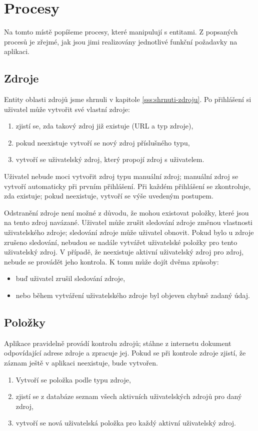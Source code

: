 \section{Procesy}

Na tomto místě popíšeme procesy, které manipulují s entitami.
Z popsaných procesů je zřejmé, jak jsou jimi realizovány jednotlivé funkční požadavky na aplikaci.

\subsection{Zdroje}

Entity oblasti zdrojů jsme shrnuli v kapitole \ref{sss:shrnuti-zdroju}.
Po přihlášení si uživatel může vytvořit své vlastní zdroje:
\begin{enumerate}
	\item zjistí se, zda takový zdroj již existuje (URL a typ zdroje),
	\item pokud neexistuje vytvoří se nový zdroj příslušného typu,
	\item vytvoří se uživatelský zdroj, který propojí zdroj s uživatelem.
\end{enumerate}

Uživatel nebude moci vytvořit zdroj typu manuální zdroj; manuální zdroj se vytvoří automaticky při prvním přihlášení.
Při každém přihlášení se zkontroluje, zda existuje; pokud neexistuje, vytvoří se výše uvedeným postupem.

Odstranění zdroje není možné z důvodu, že mohou existovat položky, které jsou na tento zdroj navázané.
Uživatel může zrušit sledování zdroje změnou vlastnosti uživatelského zdroje; sledování zdroje může uživatel obnovit.
Pokud bylo u zdroje zrušeno sledování, nebudou se nadále vytvářet uživatelské položky pro tento uživatelský zdroj.
V případě, že neexistuje aktivní uživatelský zdroj pro zdroj, nebude se provádět jeho kontrola.
K tomu může dojít dvěma způsoby:
\begin{itemize}
	\item buď uživatel zrušil sledování zdroje,
	\item nebo během vytváření uživatelského zdroje byl objeven chybně zadaný údaj.
\end{itemize}

\subsection{Položky}

Aplikace pravidelně provádí kontrolu zdrojů; stáhne z internetu dokument odpovídající adrese zdroje a zpracuje jej.
Pokud se při kontrole zdroje zjistí, že záznam ještě v aplikaci neexistuje, bude vytvořen.
\begin{enumerate}
	\item Vytvoří se položka podle typu zdroje,
	\item zjistí se z databáze seznam všech aktivních uživatelských zdrojů pro daný zdroj,
	\item vytvoří se nová uživatelská položka pro každý aktivní uživatelský zdroj.
\end{enumerate}


